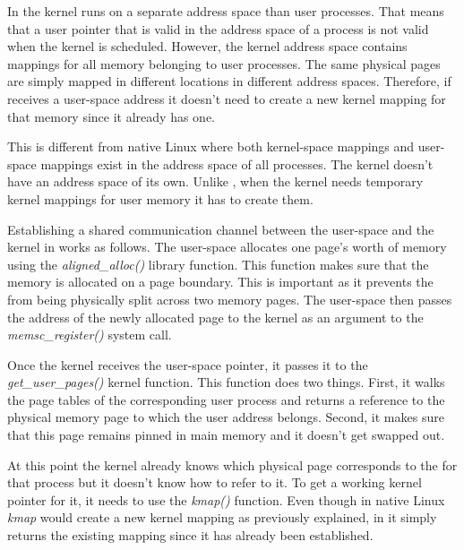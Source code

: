 In \llinux the kernel runs on a separate address space than user processes.
That means that a user pointer that is valid in the address space of a process
is not valid when the kernel is scheduled. However, the kernel address space
contains mappings for all memory belonging to user processes. The same physical
pages are simply mapped in different locations in different address spaces.
Therefore, if \llinux receives a user-space address it doesn't need to create a
new kernel mapping for that memory since it already has one.

This is different from native Linux where both kernel-space mappings and
user-space mappings exist in the address space of all processes\footnotemark.
The kernel doesn't have an address space of its own. Unlike \llinux, when the
kernel needs temporary kernel mappings for user memory it has to create them.


Establishing a shared communication channel between the user-space and the
kernel in \memsc works as follows. The user-space allocates one page's worth of
memory using the \emph{aligned\_alloc()} library function. This function makes
sure that the memory is allocated on a page boundary. This is important as it
prevents the \sysp from being physically split across two memory pages. The
user-space then passes the address of the newly allocated page to the kernel as
an argument to the \emph{memsc\_register()} system call.

Once the kernel receives the user-space pointer, it passes it to the
\emph{get\_user\_pages()} kernel function. This function does two things.
First, it walks the page tables of the corresponding user process and returns a
reference to the physical memory page to which the user address belongs.
Second, it makes sure that this page remains pinned in main memory and it
doesn't get swapped out.

At this point the kernel already knows which physical page corresponds to the
\sysp for that process but it doesn't know how to refer to it. To get a working
kernel pointer for it, it needs to use the \emph{kmap()} function. Even though
in native Linux \emph{kmap} would create a new kernel mapping as previously
explained, in \llinux it simply returns the existing mapping since it has
already been established.

